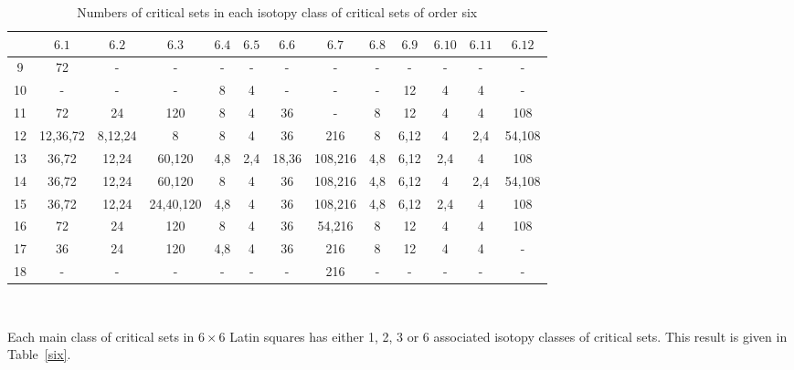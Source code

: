 \documentclass[12pt]{report}
\begin{document}
\begin{table}
\begin{center}
\setlength{\tabcolsep}{4.5pt}
\begin{footnotesize}
\caption{Numbers of critical sets in each isotopy class of critical sets of order six}
\vspace{1mm}
\label{five}
\begin{tabular}{|*{13}{c|}} \hline
& $6.1$ & $6.2$ & $6.3$ & $6.4$ & $6.5$ & $6.6$ & $6.7$ & $6.8$ & $6.9$ & $6.10$ & $6.11$ & $6.12$ \\
\hline
9 &  72 &   -   &    -   &  -   &  -   &   -   &    -   &  -   & -     &  -   &  -   &  - \\
10 &   -   &   -   &    -   & 8 & 4 &   -   &    -   &  -   & 12 & 4 & 4 &  - \\
11 & 72 & 24 & 120 & 8 & 4 & 36 &    -   & 8 & 12 & 4 & 4 & 108  \\
12 & 12,36,72 & 8,12,24 & 8  & 8 & 4 & 36 & 216 & 8 & 6,12 & 4 & 2,4 & 54,108 \\
13 & 36,72 & 12,24 & 60,120 & 4,8 & 2,4 & 18,36 & 108,216 & 4,8 & 6,12 & 2,4 & 4 & 108 \\
14 & 36,72 & 12,24 & 60,120 & 8 & 4  & 36 & 108,216 & 4,8 & 6,12 & 4 & 2,4 & 54,108 \\
15 & 36,72 & 12,24 & 24,40,120 & 4,8 & 4 & 36 & 108,216 & 4,8 & 6,12 & 2,4 & 4 & 108 \\
16 & 72 & 24 & 120 & 8 & 4 & 36 & 54,216 & 8 & 12 & 4 & 4 & 108 \\
17 & 36 & 24 & 120 & 4,8 & 4 & 36 & 216 & 8 & 12 & 4 & 4 &    - \\
18 &   -   &   -   &    -   &  -   &  -   &   -   & 216 &  -   &   -   &  -   &  -   &    -  \\
\hline
\end{tabular}\vspace {3mm} \\
\end{footnotesize}
\end{center}
\end{table}

Each main class of critical sets in $6 \times 6$ Latin squares has either
1, 2, 3 or 6 associated isotopy classes of critical sets.  
This result is given in Table~\ref{six}. 
\end{document}
